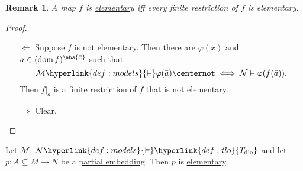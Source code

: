 \documentclass{article}
\let\models\vDash
\DeclareMathOperator{\dom}{dom}
\DeclareMathOperator{\img}{img}
\newtheorem{nremark}[nthm]{Remark}
\begin{document}
\begin{nremark}\label{rem:4.11}
  A map $f$ is \hyperlink{def:elmap}{elementary} iff every finite restriction of $f$ is elementary.
\end{nremark}
\begin{proof}\leavevmode
  \begin{itemize}
    \item[$\Leftarrow$] Suppose $f$ is not \hyperlink{def:elmap}{elementary}. Then there are $\varphi(\bar{x})$ and $\bar{a} \in (\dom f)^{\abs{\bar{x}}}$ such that
      \begin{equation*}\mathcal{M} \hyperlink{def:models}{\models} \varphi(\bar{a}) \centernot\iff \mathcal{N} \models \varphi(f(\bar{a})).\end{equation*}
        Then $f|_{\bar{a}}$ is a finite restriction of $f$ that is not elementary.

  \item[$\Rightarrow$] Clear.\qedhere
  \end{itemize}
\end{proof}
\begin{nprop}\label{prop:4.12}
  Let $\mathcal{M}$, $\mathcal{N} \hyperlink{def:models}{\models} \hyperlink{def:tlo}{T_{\text{dlo}}}$ and let $p: A \subseteq M \to N$ be a \hyperlink{def:pe}{partial embedding}.
  Then $p$ is \hyperlink{def:elmap}{elementary}.
\end{nprop}
\end{document}
